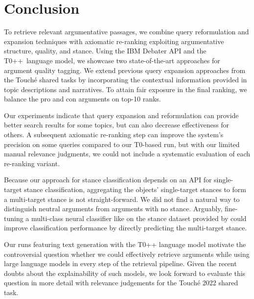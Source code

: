 \section{Conclusion}

To retrieve relevant argumentative passages, we combine query reformulation and expansion techniques with axiomatic re-ranking exploiting argumentative structure, quality, and stance.
Using the IBM Debater API and the T0++~language model, we showcase two state-of-the-art approaches for argument quality tagging.
We extend previous query expansion approaches from the Touché shared tasks by incorporating the contextual information provided in topic descriptions and narratives.
To attain fair exposure in the final ranking, we balance the pro and con arguments on top-10 ranks.

Our experiments indicate that query expansion and reformulation can provide better search results for some topics, but can also decrease effectiveness for others.
A subsequent axiomatic re-ranking step can improve the system's precision on some queries compared to our T0-based run, but with our limited manual relevance judgments, we could not include a systematic evaluation of each re-ranking variant.

Because our approach for stance classification depends on an API for single-target stance classification, aggregating the objects' single-target stances to form a multi-target stance is not straight-forward.
We did not find a natural way to distinguish neutral arguments from arguments with no stance.
Arguably, fine-tuning a multi-class neural classifier like \Bert on the stance dataset provided by \citeauthor{BondarenkoFKSGBPBSWPH2022} could improve classification performance by directly predicting the multi-target stance.

Our runs featuring text generation with the T0++ language model motivate the controversial question whether we could effectively retrieve arguments while using large language models in every step of the retrieval pipeline.
Given the recent doubts about the explainability of such models, we look forward to evaluate this question in more detail with relevance judgements for the Touché 2022 shared task.
